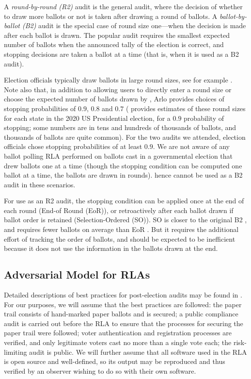 A {\em round-by-round (R2)} audit is the general audit, where the decision of whether to draw more ballots or not is taken after drawing a round of ballots. A {\em ballot-by-ballot (B2)} audit is the special case of round size one---when the decision is made after each ballot is drawn. The popular \BRAVO audit requires the smallest expected number of ballots when the announced tally of the election is correct, and stopping decisions are taken a ballot at a time (that is, when it is used as a B2 audit). 

Election officials typically draw ballots in large round sizes, see for example \cite{va-2022,RI-report}. Note also that, in addition to allowing users to directly enter a round size or choose the expected number of ballots drawn by \BRAVO, Arlo provides choices of stopping probabilities of $0.9$, $0.8$ and $0.7$ (\cite{usenix_minerva} provides estimates of these round sizes for each state in the 2020 US Presidential election, for a $0.9$ probability of stopping; some numbers are in tens and hundreds of thousands of ballots, and thousands of ballots are quite common). For the two audits we attended, election officials chose stopping probabilities of at least $0.9$. We are not aware of any ballot polling RLA performed on ballots cast in a governmental election that drew ballots one at a time (though the stopping condition can be computed one ballot at a time, the ballots are drawn in rounds). \BRAVO hence cannot be used as a B2 audit in these scenarios. 

For use as an R2 audit, the \BRAVO stopping condition can be applied once at the end of each round (End-of Round (EoR)), or retroactively after each ballot drawn if ballot order is retained (Selection-Ordered (SO)). SO \BRAVO is closer to the original B2 \BRAVO, and requires fewer ballots on average than EoR \BRAVO. But it requires the additional effort of tracking the order of ballots, and should be expected to be inefficient because it does not use the information in the ballots drawn at the end. 

\subsection{Adversarial Model for RLAs}
\label{sec:adv}
Detailed descriptions of best practices for post-election audits may be found in \cite{best-practices,why-and-how}. For our purposes, we will assume that the best practices are followed: the paper trail consists of hand-marked paper ballots and is secured; a public compliance audit is carried out before the RLA to ensure that the processes for securing the paper trail were followed; voter authentication and registration processes are verified, and only legitimate voters cast no more than a single vote each; the risk-limiting audit is public. We will further assume that all software used in the RLA is open source and well-defined, so its output may be reproduced and thus verified by an observer wishing to do so with their own software. 

